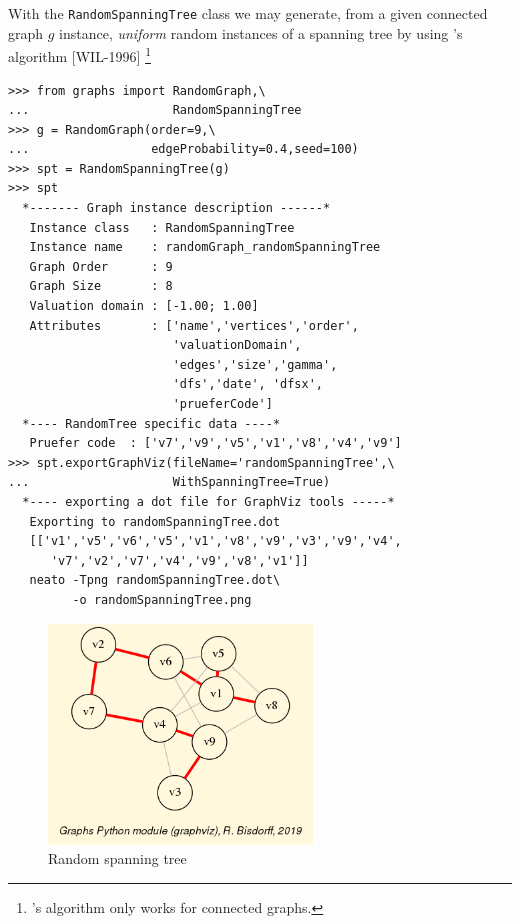 With the \texttt{RandomSpanningTree} class we may generate, from a given connected graph $g$ instance, \emph{uniform} random instances of a spanning tree by using \Wilson's algorithm [WIL-1996] \footnote{\Wilson's algorithm only works for connected graphs.}
\begin{lstlisting}
>>> from graphs import RandomGraph,\
...                    RandomSpanningTree
>>> g = RandomGraph(order=9,\
...                 edgeProbability=0.4,seed=100)
>>> spt = RandomSpanningTree(g)
>>> spt
  *------- Graph instance description ------*
   Instance class   : RandomSpanningTree
   Instance name    : randomGraph_randomSpanningTree
   Graph Order      : 9
   Graph Size       : 8
   Valuation domain : [-1.00; 1.00]
   Attributes       : ['name','vertices','order',
                       'valuationDomain',
                       'edges','size','gamma',
                       'dfs','date', 'dfsx',
                       'prueferCode']
  *---- RandomTree specific data ----*
   Pruefer code  : ['v7','v9','v5','v1','v8','v4','v9']
>>> spt.exportGraphViz(fileName='randomSpanningTree',\
...                    WithSpanningTree=True)
  *---- exporting a dot file for GraphViz tools -----*
   Exporting to randomSpanningTree.dot
   [['v1','v5','v6','v5','v1','v8','v9','v3','v9','v4',
      'v7','v2','v7','v4','v9','v8','v1']]
   neato -Tpng randomSpanningTree.dot\
         -o randomSpanningTree.png
\end{lstlisting}
\begin{figure}[h]
\sidecaption
\includegraphics[width=7cm]{Figures/randomSpanningTree.png}
\caption{Random spanning tree} 
\label{fig:23.5}       %
\end{figure}

